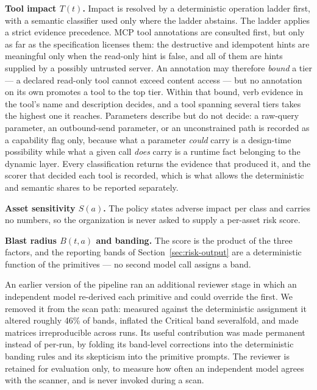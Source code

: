 \documentclass[sigconf]{acmart}
\begin{document}
\textbf{Tool impact $T(t)$.} Impact is resolved by a deterministic operation
ladder first, with a semantic classifier used only where the ladder abstains.
The ladder applies a strict evidence precedence. MCP tool annotations are
consulted first, but only as far as the specification licenses them: the
destructive and idempotent hints are meaningful only when the read-only hint is
false, and all of them are hints supplied by a possibly untrusted server. An
annotation may therefore \emph{bound} a tier --- a declared read-only tool
cannot exceed content access --- but no annotation on its own promotes a tool
to the top tier. Within that bound, verb evidence in the tool's name and
description decides, and a tool spanning several tiers takes the highest one it
reaches. Parameters describe but do not decide: a raw-query parameter, an
outbound-send parameter, or an unconstrained path is recorded as a capability
flag only, because what a parameter \emph{could} carry is a design-time
possibility while what a given call \emph{does} carry is a runtime fact
belonging to the dynamic layer. Every classification returns the evidence that
produced it, and the scorer that decided each tool is recorded, which is what
allows the deterministic and semantic shares to be reported separately.

\textbf{Asset sensitivity $S(a)$.} The policy states adverse impact per class
and carries no numbers, so the organization is never asked to supply a
per-asset risk score.

\textbf{Blast radius $B(t,a)$ and banding.} The score is the product of the
three factors, and the reporting bands of Section~\ref{sec:risk-output} are a
deterministic function of the primitives --- no second model call assigns a
band.

An earlier version of the pipeline ran an additional reviewer stage in which an
independent model re-derived each primitive and could override the first. We
removed it from the scan path: measured against the deterministic assignment it
altered roughly 46\% of bands, inflated the Critical band severalfold, and made
matrices irreproducible across runs. Its useful contribution was made permanent
instead of per-run, by folding its band-level corrections into the deterministic
banding rules and its skepticism into the primitive prompts. The reviewer is
retained for evaluation only, to measure how often an independent model agrees
with the scanner, and is never invoked during a scan.


\end{document}
